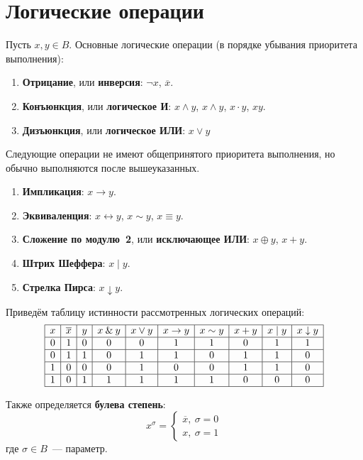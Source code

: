\section{Логические операции}
Пусть $x, y \in B$.
 Основные логические операции (в порядке убывания приоритета выполнения):
\begin{enumerate}
	\item {}  \textbf{Отрицание}, или \textbf{инверсия}: $\lnot x$, $\overline x$.
	\item {} \textbf{Конъюнкция}, или \textbf{логическое И}: $x \land y$, $x \wedge y$, $x \cdot y$, $xy$.
	\item {} \textbf{Дизъюнкция}, или \textbf{логическое ИЛИ}: $x \lor y$
\end{enumerate}

Следующие операции не имеют общепринятого приоритета выполнения, но обычно выполняются после вышеуказанных.
\begin{enumerate}
	\item \textbf{Импликация}: $x \rightarrow y$.
	\item \textbf{Эквиваленция}: $x \leftrightarrow y$, $x \sim y$, $x \equiv y$.
	\item \textbf{Сложение по модулю~2}, или \textbf{исключающее ИЛИ}: $x \oplus y$, $x + y$.
	\item \textbf{Штрих Шеффера}: $x \mid y$.
	\item \textbf{Стрелка Пирса}: $x \downarrow y$.
\end{enumerate}

Приведём таблицу истинности рассмотренных логических операций:
\begin{equation*}
\begin{array}{|c|c|c|c|c|c|c|c|c|c|}
\hline
x & \overline x & y & x \land y & x \lor y & x \rightarrow y & x \sim y & x + y & x \mid y & x \downarrow y \\
\hline
0 & 1 & 0 & 0 & 0 & 1 & 1 & 0 & 1 & 1 \\
\hline
0 & 1 & 1 & 0 & 1 & 1 & 0 & 1 & 1 & 0 \\
\hline
1 & 0 & 0 & 0 & 1 & 0 & 0 & 1 & 1 & 0 \\
\hline
1 & 0 & 1 & 1 & 1 & 1 & 1 & 0 & 0 & 0 \\
\hline
\end{array}
\end{equation*}

 Также определяется \textbf{булева степень}:
\begin{equation*}
x^\sigma =
\begin{cases}
\overline x, \ \sigma = 0 \\
x, \ \sigma = 1
\end{cases}
\end{equation*}
где $\sigma \in B$~--- параметр.